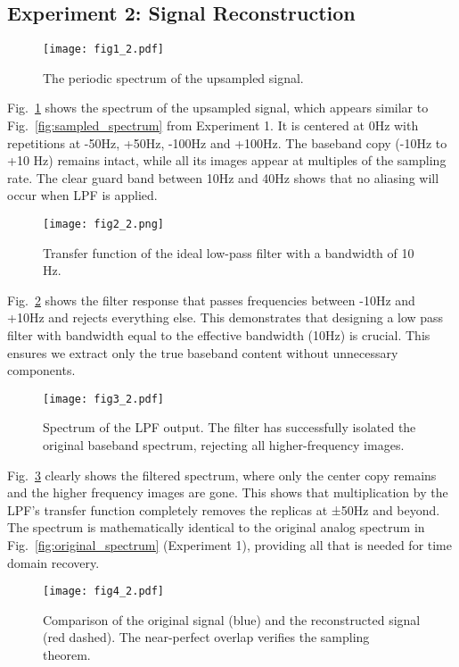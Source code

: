 \documentclass[conference]{IEEEtran}
\begin{document}
\subsection{Experiment 2: Signal Reconstruction}
\begin{figure}[H]
    \centering
    \texttt{[image: fig1\_2.pdf]}
    \caption{The periodic spectrum of the upsampled signal.}
    \label{fig:upsampled_spectrum}
\end{figure}
Fig.~\ref{fig:upsampled_spectrum} shows the spectrum of the upsampled signal, which appears similar to Fig.~\ref{fig:sampled_spectrum} from Experiment 1. It is centered at 0Hz with repetitions at -50Hz, +50Hz, -100Hz and +100Hz. The baseband copy (-10Hz to +10 Hz) remains intact, while all its images appear at multiples of the sampling rate. The clear guard band between 10Hz and 40Hz shows that no aliasing will occur when LPF is applied.

\begin{figure}[H]
    \centering
    \texttt{[image: fig2\_2.png]}
    \caption{Transfer function of the ideal low-pass filter with a bandwidth of 10 Hz.}
    \label{fig:lpf}
\end{figure}

Fig.~\ref{fig:lpf} shows the filter response that passes frequencies between -10Hz and +10Hz and rejects everything else. This demonstrates that designing a low pass filter with bandwidth equal to the effective bandwidth (10Hz) is crucial. This ensures we extract only the true baseband content without unnecessary components.

\begin{figure}[H]
    \centering
    \texttt{[image: fig3\_2.pdf]}
    \caption{Spectrum of the LPF output. The filter has successfully isolated the original baseband spectrum, rejecting all higher-frequency images.}
    \label{fig:filtered_spectrum}
\end{figure}

Fig.~\ref{fig:filtered_spectrum} clearly shows the filtered spectrum, where only the center copy remains and the higher frequency images are gone. This shows that multiplication by the LPF's transfer function completely removes the replicas at ±50Hz and beyond. The spectrum is mathematically identical to the original analog spectrum in Fig.~\ref{fig:original_spectrum} (Experiment 1), providing all that is needed for time domain recovery.

\begin{figure}[H]
    \centering
    \texttt{[image: fig4\_2.pdf]}
    \caption{Comparison of the original signal (blue) and the reconstructed signal (red dashed). The near-perfect overlap verifies the sampling theorem.}
    \label{fig:reconstruction}
\end{figure}
\end{document}
